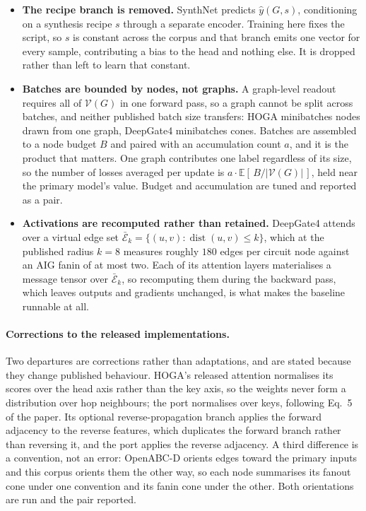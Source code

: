 \begin{itemize}
    \item \textbf{The recipe branch is removed.} SynthNet predicts $\hat{y}(G, s)$,
    conditioning on a synthesis recipe $s$ through a separate encoder. Training here fixes
    the script, so $s$ is constant across the corpus and that branch emits one vector for
    every sample, contributing a bias to the head and nothing else. It is dropped rather
    than left to learn that constant.
    \item \textbf{Batches are bounded by nodes, not graphs.} A graph-level readout requires
    all of $\mathcal{V}(G)$ in one forward pass, so a graph cannot be split across batches,
    and neither published batch size transfers: HOGA minibatches nodes drawn from one
    graph, DeepGate4 minibatches cones. Batches are assembled to a node budget $B$ and
    paired with an accumulation count $a$, and it is the product that matters. One graph
    contributes one label regardless of its size, so the number of losses averaged per
    update is $a \cdot \mathbb{E}[\,B / |\mathcal{V}(G)|\,]$, held near the primary
    model's value.
    Budget and accumulation are tuned and reported as a pair.
    \item \textbf{Activations are recomputed rather than retained.} DeepGate4 attends over a
    virtual edge set $\bar{\mathcal{E}}_k = \{(u,v) : \operatorname{dist}(u,v) \leq k\}$,
    which at the published radius $k = 8$ measures roughly $180$ edges per circuit node
    against an AIG fanin of at most two. Each of its attention layers materialises a message
    tensor over $\bar{\mathcal{E}}_k$, so recomputing them during the backward pass, which
    leaves outputs and gradients unchanged, is what makes the baseline runnable at all.
\end{itemize}

\paragraph{Corrections to the released implementations.}
Two departures are corrections rather than adaptations, and are stated because they change
published behaviour. HOGA's released attention normalises its scores over the head axis
rather than the key axis, so the weights never form a distribution over hop neighbours; the
port normalises over keys, following Eq.~5 of the paper. Its optional reverse-propagation
branch applies the forward adjacency to the reverse features, which duplicates the forward
branch rather than reversing it, and the port applies the reverse adjacency. A third
difference is a convention, not an error: OpenABC-D orients edges toward the primary
inputs and this corpus orients them the
other way, so each node summarises its fanout cone under one convention and its fanin cone
under the other. Both orientations are run and the pair reported.

